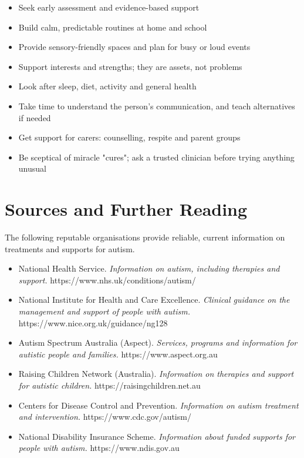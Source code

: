 \begin{itemize}
    \item Seek early assessment and evidence-based support
    \item Build calm, predictable routines at home and school
    \item Provide sensory-friendly spaces and plan for busy or loud events
    \item Support interests and strengths; they are assets, not problems
    \item Look after sleep, diet, activity and general health
    \item Take time to understand the person's communication, and teach alternatives if needed
    \item Get support for carers: counselling, respite and parent groups
    \item Be sceptical of miracle "cures"; ask a trusted clinician before trying anything unusual
\end{itemize}

\section*{Sources and Further Reading}
The following reputable organisations provide reliable, current information on treatments and supports for autism.

\begin{itemize}
    \item National Health Service. \textit{Information on autism, including therapies and support.} https://www.nhs.uk/conditions/autism/
    \item National Institute for Health and Care Excellence. \textit{Clinical guidance on the management and support of people with autism.} https://www.nice.org.uk/guidance/ng128
    \item Autism Spectrum Australia (Aspect). \textit{Services, programs and information for autistic people and families.} https://www.aspect.org.au
    \item Raising Children Network (Australia). \textit{Information on therapies and support for autistic children.} https://raisingchildren.net.au
    \item Centers for Disease Control and Prevention. \textit{Information on autism treatment and intervention.} https://www.cdc.gov/autism/
    \item National Disability Insurance Scheme. \textit{Information about funded supports for people with autism.} https://www.ndis.gov.au
\end{itemize}
